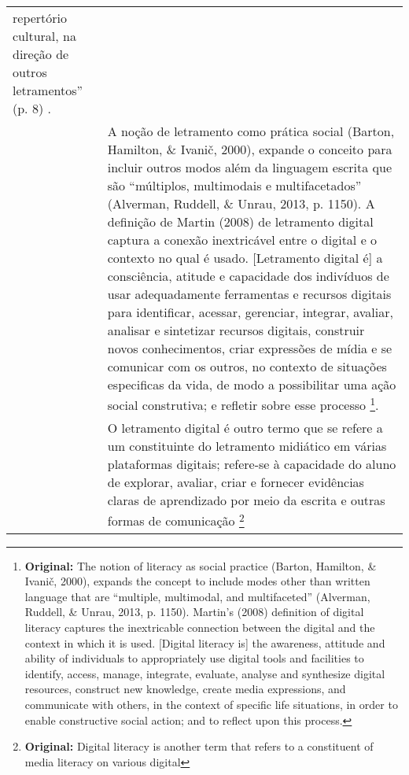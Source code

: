 \begin{small}
\begin{longtable}{p{} p{}}
    repertório cultural, na direção de outros letramentos'' (p. 8) \cite[p.~146]{xavier2019construcao}. \\
    \textcite{campbell2020developing} & 
    A noção de letramento como prática social (Barton, Hamilton, \& Ivanič,
    2000), expande o conceito para incluir outros modos além da linguagem
    escrita que são ``múltiplos, multimodais e multifacetados'' (Alverman,
    Ruddell, \& Unrau, 2013, p. 1150). A definição de Martin (2008) de
    letramento digital captura a conexão inextricável entre o digital e o
    contexto no qual é usado.
    {[}Letramento digital é{]} a consciência, atitude e capacidade dos
    indivíduos de usar adequadamente ferramentas e recursos digitais para
    identificar, acessar, gerenciar, integrar, avaliar, analisar e
    sintetizar recursos digitais, construir novos conhecimentos, criar
    expressões de mídia e se comunicar com os outros, no contexto de
    situações especificas da vida, de modo a possibilitar uma ação social
    construtiva; e refletir sobre esse processo \cite[p.~167, tradução nossa]{campbell2020developing}\footnote{\textbf{Original:} The notion of
      literacy as social practice (Barton, Hamilton, \& Ivanič, 2000),
      expands the concept to include modes other than written language that
      are ``multiple, multimodal, and multifaceted'' (Alverman, Ruddell, \&
      Unrau, 2013, p. 1150). Martin's (2008) definition of digital literacy
      captures the inextricable connection between the digital and the
      context in which it is used. {[}Digital literacy is{]} the awareness,
      attitude and ability of individuals to appropriately use digital tools
      and facilities to identify, access, manage, integrate, evaluate,
      analyse and synthesize digital resources, construct new knowledge,
      create media expressions, and communicate with others, in the context
      of specific life situations, in order to enable constructive social
      action; and to reflect upon this process.}.\strut
     \\
    \textcite{almusharraf2020postsecondary} & O letramento digital é outro termo que se
    refere a um constituinte do letramento midiático em várias plataformas
    digitais; refere-se à capacidade do aluno de explorar, avaliar, criar e
    fornecer evidências claras de aprendizado por meio da escrita e outras
    formas de comunicação \cite[p.~86, tradução
    nossa]{almusharraf2020postsecondary}\footnote{\textbf{Original:} Digital literacy is another term that
      refers to a constituent of media literacy on various digital
}
\end{longtable}
\end{small}
